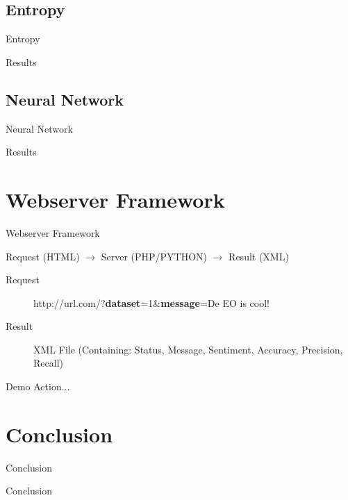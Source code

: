 \documentclass{beamer}
\begin{document}
\subsection{Entropy}
\begin{frame}{Entropy}
\end{frame}
\begin{frame}{Results}
\end{frame}

\subsection{Neural Network}
\begin{frame}{Neural Network}
\end{frame}
\begin{frame}{Results}
\end{frame}

\section{Webserver Framework}
\begin{frame}{Webserver Framework}
\begin{center}
Request (HTML) $\rightarrow$ Server (PHP/PYTHON) $\rightarrow$ Result (XML)
\end{center}

\begin{description}
\item[Request] http://url.com/?\textbf{dataset}=1\&\textbf{message}=De EO is cool!\\
\item[Result] XML File (Containing: Status, Message, Sentiment, Accuracy, Precision, Recall)
\end{description}
\end{frame}
\begin{frame}{Demo}
Action...
\end{frame}

\section{Conclusion}

\begin{frame}{Conclusion}
\end{frame}
\begin{frame}{Conclusion}
\end{frame}
\end{document}
